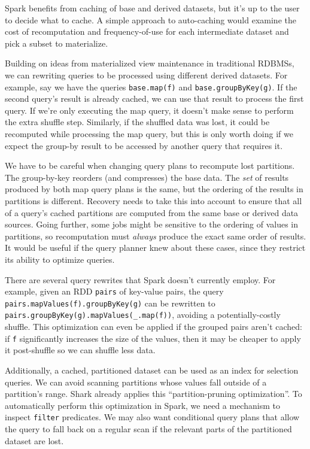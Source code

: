 \documentclass[12pt]{article}
\begin{document}
Spark benefits from caching of base and derived datasets, but it's up to the
user to decide what to cache.
A simple approach to auto-caching would examine the cost of recomputation and
frequency-of-use for each intermediate dataset and pick a subset to
materialize.

Building on ideas from materialized view maintenance in traditional RDBMSs, we
can rewriting queries to be processed using different derived datasets.  For
example, say we have the queries \texttt{base.map(f)} and
\texttt{base.groupByKey(g)}.  If the second query's result is already cached,
we can use that result to process the first query.  If we're only executing
the map query, it doesn't make sense to perform the extra shuffle step.
Similarly, if the shuffled data was lost, it could be recomputed while
processing the map query, but this is only worth doing if we expect the
group-by result to be accessed by another query that requires it.

We have to be careful when changing query plans to recompute lost partitions.
The group-by-key reorders (and compresses) the base data.  The \emph{set} of
results produced by both map query plans is the same, but the ordering of the
results in partitions is different.  Recovery needs to take this into account
to ensure that all of a query's cached partitions are computed from the same
base or derived data sources.  Going further, some jobs might be sensitive to
the ordering of values in partitions, so recomputation must \emph{always}
produce the exact same order of results.  It would be useful if the query
planner knew about these cases, since they restrict its ability to optimize
queries.

There are several query rewrites that Spark doesn't currently employ.  For example, given an RDD \texttt{pairs} of key-value pairs, the query
\texttt{pairs.mapValues(f).groupByKey(g)} can be rewritten to
\texttt{pairs.groupByKey(g).mapValues(\_.map(f))}, avoiding
a potentially-costly shuffle.  This optimization can even be applied if the
grouped pairs aren't cached: if \texttt{f} significantly increases the size of
the values, then it may be cheaper to apply it post-shuffle so we can shuffle
less data.

Additionally, a cached, partitioned dataset can be used as an index for
selection queries.  We can avoid scanning partitions whose values fall outside
of a partition's range.  Shark already applies this ``partition-pruning
optimization''.  To automatically perform this optimization in Spark, we need
a mechanism to inspect \texttt{filter} predicates.  We may also want
conditional query plans that allow the query to fall back on a regular scan if
the relevant parts of the partitioned dataset are lost.
\end{document}
